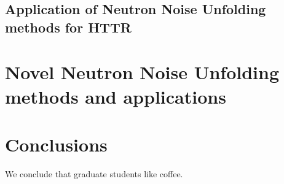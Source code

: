 \documentclass{uiucthesis2021}
\newcounter{counterforappendices}
\begin{document}
\section{Application of Neutron Noise Unfolding methods for HTTR}


\chapter{Novel Neutron Noise Unfolding methods and applications}


\chapter{Conclusions}

We conclude that graduate students like coffee.

\backmatter

\printbibliography[heading=bibintoc,title={References}]

\clearpage
\setcounter{counterforappendices}{\value{page}}
\mainmatter
\setcounter{page}{\value{counterforappendices}}




% 
\end{document}
